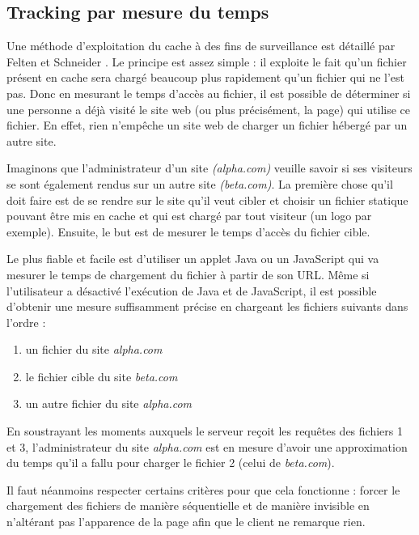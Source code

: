 \subsection{Tracking par mesure du temps}
Une méthode d'exploitation du cache à des fins de surveillance est détaillé par Felten et Schneider \cite{Felten:2000:TAW:352600.352606}.
Le principe est assez simple : il exploite le fait qu'un fichier présent en cache sera chargé beaucoup plus rapidement qu'un fichier qui ne l'est pas. Donc en mesurant le temps d'accès au fichier, il est possible de déterminer si une personne a déjà visité le site web (ou plus précisément, la page) qui utilise ce fichier. En effet, rien n'empêche un site web de charger un fichier hébergé par un autre site.
\newline

Imaginons que l'administrateur d'un site \emph{(alpha.com)} veuille savoir si ses visiteurs se sont également rendus sur un autre site \emph{(beta.com)}. La première chose qu'il doit faire est de se rendre sur le site qu'il veut cibler et choisir un fichier statique pouvant être mis en cache et qui est chargé par tout visiteur (un logo par exemple). Ensuite, le but est de mesurer le temps d'accès du fichier cible.

Le plus fiable et facile est d'utiliser un applet Java ou un JavaScript qui va mesurer le temps de chargement du fichier à partir de son URL. Même si l'utilisateur a désactivé l'exécution de Java et de JavaScript, il est possible d'obtenir une mesure suffisamment précise en chargeant les fichiers suivants dans l'ordre :

\begin{enumerate}
  \item un fichier du site \emph{alpha.com}
  \item le fichier cible du site \emph{beta.com}
  \item un autre fichier du site \emph{alpha.com}
\end{enumerate}

En soustrayant les moments auxquels le serveur reçoit les requêtes des fichiers 1 et 3, l'administrateur du site \emph{alpha.com} est en mesure d'avoir une approximation du temps qu'il a fallu pour charger le fichier 2 (celui de \emph{beta.com}).

Il faut néanmoins respecter certains critères pour que cela fonctionne : forcer le chargement des fichiers de manière séquentielle et de manière invisible en n'altérant pas l'apparence de la page afin que le client ne remarque rien.
\newline

